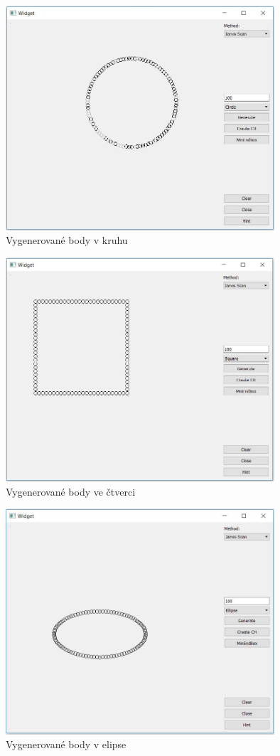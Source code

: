 \documentclass[a4paper, 12pt]{article}
\begin{document}
\begin{figure}[h!]
	\centering
	\includegraphics[width=10cm]{circle.jpg}
	\caption{Vygenerované body v kruhu}
\end{figure}

\begin{figure}[h!]
	\centering
	\includegraphics[width=10cm]{square.jpg}
	\caption{Vygenerované body ve čtverci}
\end{figure}

\begin{figure}[h!]
	\centering
	\includegraphics[width=10cm]{ellipse.jpg}
	\caption{Vygenerované body v elipse}
\end{figure}
\end{document}
